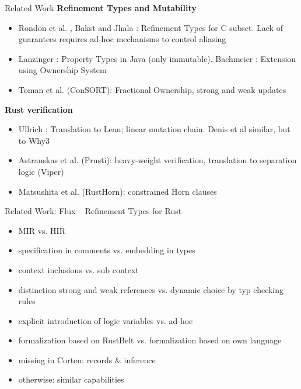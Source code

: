 \documentclass{sdqbeamer}
\begin{document}
\begin{frame}{Related Work}
  \textbf{Refinement Types and Mutability}
  \begin{itemize}
    \item Rondon et al. \cite{rondon_low-level_2010}, Bakst and Jhala \cite{bakst_predicate_2016}: Refinement Types for C subset. Lack of guarantees requires ad-hoc mechanisms to control aliasing
    \item Lanzinger \cite{lanzinger_property_2021}: Property Types in Java (only immutable). Bachmeier \cite{bachmeier_property_2022}: Extension using Ownership System
    \item Toman et al. \cite{toman_consort_2020} (ConSORT): Fractional Ownership, strong and weak updates
  \end{itemize}
  \textbf{Rust verification}
  \begin{itemize}
    \item Ullrich \cite{ullrich_simple_2016}: Translation to Lean; linear mutation chain. Denis et al \cite{denis_creusot_2021} similar, but to Why3
    \item Astrauskas et al. \cite{astrauskas_leveraging_2019} (Prusti): heavy-weight verification, translation to separation logic (Viper)
    \item Matsushita et al. \cite{matsushita_rusthorn_2020} (RustHorn): constrained Horn clauses 
  \end{itemize}
\end{frame}

\begin{frame}{Related Work: Flux -- Refinement Types for Rust}
  \begin{itemize}
    \item MIR vs. HIR
    \item specification in comments vs. embedding in types
    \item context inclusions vs. sub context
    \item distinction strong and weak references vs. dynamic choice by typ checking rules
    \item explicit introduction of logic variables vs. ad-hoc
    \item formalization based on RustBelt vs. formalization based on own language
    \item missing in Corten: records \& inference
    \item otherwise: similar capabilities
  \end{itemize}

  
\end{frame}
\end{document}
